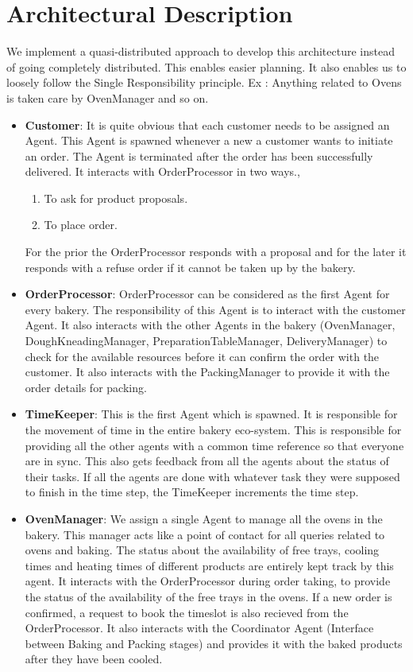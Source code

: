 \documentclass[12pt]{article}
\begin{document}
\section{Architectural Description}%
\label{sec:description}
We implement a quasi-distributed approach to develop this architecture instead of going completely distributed. This enables easier planning. It also enables us to loosely follow the Single Responsibility principle. Ex : Anything related to Ovens is taken care by OvenManager and so on.
\begin{itemize}
    \item \textbf{Customer}: It is quite obvious that each customer needs to be assigned an Agent. This Agent is spawned whenever a new a customer wants to initiate an order. The Agent is terminated after the order has been successfully delivered. It interacts with OrderProcessor in two ways.,
    \begin{enumerate}
    	\item To ask for product proposals.
    	\item To place order. 
    \end{enumerate}
    For the prior the OrderProcessor responds with a proposal and for the later it responds with a refuse order if it cannot be taken up by the bakery.
    \item \textbf{OrderProcessor}: OrderProcessor can be considered as the first Agent for every bakery. The responsibility of this Agent is to interact with the customer Agent. It also interacts with the other Agents in the bakery (OvenManager, DoughKneadingManager, PreparationTableManager, DeliveryManager) to check for the available resources before it can confirm the order with the customer. It also interacts with the PackingManager to provide it with the order details for packing.
    \item \textbf{TimeKeeper}: This is the first Agent which is spawned. It is responsible for the movement of time in the entire bakery eco-system. This is responsible for providing all the other agents with a common time reference so that everyone are in sync. This also gets feedback from all the agents about the status of their tasks. If all the agents are done with whatever task they were supposed to finish in the time step, the TimeKeeper increments the time step.
    \item \textbf{OvenManager}: We assign a single Agent to manage all the ovens in the bakery. This manager acts like a point of contact for all queries related to ovens and baking. The status about the availability of free trays, cooling times and heating times of different products are entirely kept track by this agent. It interacts with the OrderProcessor during order taking, to provide the status of the availability of the free trays in the ovens. If a new order is confirmed, a request to book the timeslot is also recieved from the OrderProcessor. It also interacts with the Coordinator Agent (Interface between Baking and Packing stages) and provides it with the baked products after they have been cooled.

\end{itemize}
\end{document}

